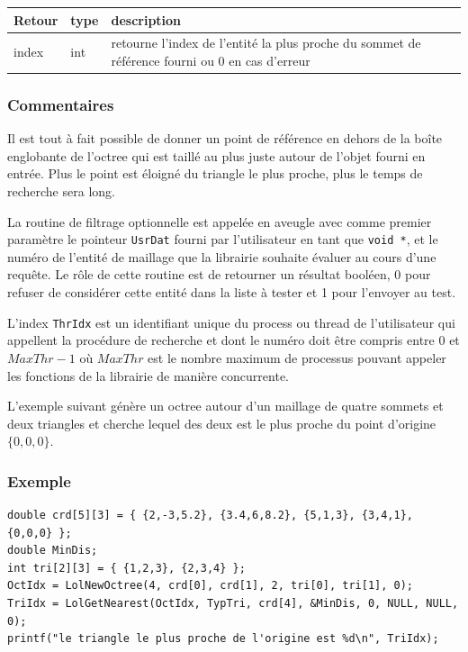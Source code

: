 \documentclass[a4paper,12pt]{article}
\begin{document}
\medskip

\begin{tabular}{|m{3cm}|m{2cm}|m{8.5cm}|}
\hline
Retour     & type   & description \\
\hline
index      & int    & retourne l'index de l'entité la plus proche du sommet de référence fourni ou 0 en cas d'erreur \\
\hline
\end{tabular}
\subsubsection*{Commentaires}
Il est tout à fait possible de donner un point de référence en dehors de la boîte englobante de l'octree qui est taillé au plus juste autour de l'objet fourni en entrée. Plus le point est éloigné du triangle le plus proche, plus le temps de recherche sera long.

La routine de filtrage optionnelle est appelée en aveugle avec comme premier paramètre le pointeur {\tt UsrDat} fourni par l'utilisateur en tant que {\tt void *}, et le numéro de l'entité de maillage que la librairie souhaite évaluer au cours d'une requête. Le rôle de cette routine est de retourner un résultat booléen, 0 pour refuser de considérer cette entité dans la liste à tester et 1 pour l'envoyer au test.

L'index {\tt ThrIdx} est un identifiant unique du process ou thread de l'utilisateur qui appellent la procédure de recherche et dont le numéro doit être compris entre $0$ et $MaxThr-1$ où $MaxThr$ est le nombre maximum de processus pouvant appeler les fonctions de la librairie de manière concurrente.

L'exemple suivant génère un octree autour d'un maillage de quatre sommets et deux triangles et cherche lequel des deux est le plus proche du point d'origine $\{0,0,0\}$.

\subsubsection*{Exemple}

\begin{tt}
\begin{verbatim}
double crd[5][3] = { {2,-3,5.2}, {3.4,6,8.2}, {5,1,3}, {3,4,1}, {0,0,0} };
double MinDis;
int tri[2][3] = { {1,2,3}, {2,3,4} };
OctIdx = LolNewOctree(4, crd[0], crd[1], 2, tri[0], tri[1], 0);
TriIdx = LolGetNearest(OctIdx, TypTri, crd[4], &MinDis, 0, NULL, NULL, 0);
printf("le triangle le plus proche de l'origine est %d\n", TriIdx);
\end{verbatim}
\end{tt}
\normalfont
\end{document}
